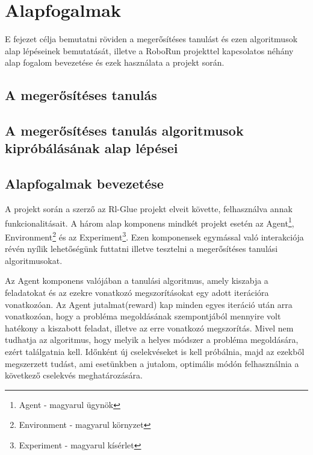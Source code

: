 \chapter{Alapfogalmak}\label{ch:ALAP}

\begin{osszefoglal}
	E fejezet célja bemutatni röviden a megerősítéses tanulást és ezen algoritmusok alap lépéseinek bemutatását, illetve a RoboRun projekttel kapcsolatos néhány alap fogalom bevezetése és ezek használata a projekt során.
\end{osszefoglal}

\section{A megerősítéses tanulás}\label{sec:ALAP:ml}


\section{A megerősítéses tanulás algoritmusok kipróbálásának alap lépései}\label{sec:ALAP:mi}


\section{Alapfogalmak bevezetése}\label{sec:ALAP:adatelem}

A projekt során a szerző az Rl-Glue projekt elveit követte, felhasználva annak funkcionalitásait. A három alap komponens mindkét projekt esetén  az Agent\footnote{Agent - magyarul ügynök}, Environment\footnote{Environment - magyarul környzet} és az Experiment\footnote{Experiment - magyarul  kísérlet}. Ezen komponensek egymással való interakciója révén nyílik lehetőségünk futtatni illetve tesztelni a megerősítéses tanulási algoritmusokat. 

	Az Agent komponens valójában a tanulási algoritmus, amely kiszabja a feladatokat és az ezekre vonatkozó megszorításokat egy adott iterációra vonatkozóan. Az Agent jutalmat(reward) kap minden egyes iteráció után arra vonatkozóan, hogy a probléma megoldásának szempontjából mennyire volt hatékony a kiszabott feladat, illetve az erre vonatkozó megszorítás. Mivel nem tudhatja az algoritmus, hogy melyik a helyes módszer a probléma megoldására, ezért találgatnia kell. Időnként új cselekvéseket is kell próbálnia, majd az ezekből megszerzett tudást, ami esetünkben a jutalom, optimális módón felhasználnia a következő cselekvés meghatározására. 
	
